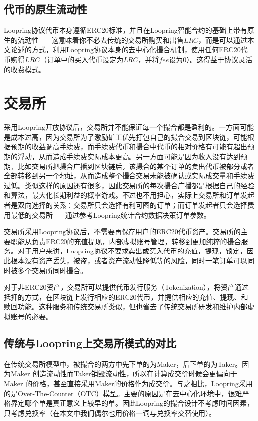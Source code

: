 \documentclass[UTF8,nofonts]{ctexart}
\begin{document}

\subsection{代币的原生流动性}

Loopring协议代币本身遵循ERC20标准，并且在Loopring智能合约的基础上带有原生的流动性\ --- 这意味着你不必去传统的交易所购买和出售$LRC$，而是可以通过本文论述的方式，利用Loopring协议本身的去中心化撮合机制，使用任何ERC20代币购得$LRC$（订单中的买入代币设定为$LRC$，并将$fee$设为0）。这得益于协议灵活的收费模式。


\section{交易所\label{sec:exchange}}

采用Loopring开放协议后，交易所并不能保证每一个撮合都是盈利的。一方面可能是成本过高，因为交易所为了激励矿工优先打包自己的撮合交易到区块链，可能根据预期的收益调高手续费，而手续费代币和撮合中代币的相对价格有可能有超出预期的浮动，从而造成手续费实际成本更高。另一方面可能是因为收入没有达到预期，比如交易所把撮合广播到区块链后，该撮合的某个订单的卖出代币被部分或者全部转移到另一个地址，从而造成整个撮合交易未能被确认或实际成交量和手续费过低。类似这样的原因还有很多，因此交易所的每次撮合广播都是根据自己的经验和算法，最大化长期利益的概率游戏。不过也不用担心，实际上交易所和订单发起者是双向选择的关系：交易所只会选择有利可图的订单；而订单发起者只会选择费用最低的交易所\ --- 通过参考Loopring统计合约数据决策订单参数。

交易所采用Loopring协议后，不需要再保存用户的ERC20代币资产。交易所的主要职能从负责ERC20的充值提现，内部虚拟账号管理，转移到更加纯粹的撮合服务。对于用户来讲，Loopring协议不要求卖出或买入代币的充值，提现，锁定，因此根本没有资产丢失，被盗，或者资产流动性降低等的风险，同时一笔订单可以同时被多个交易所同时撮合。

对于非ERC20资产，交易所可以提供代币发行服务（Tokenization），将资产通过抵押的方式，在区块链上发行相应的ERC20代币，并提供相应的充值、提现、和赎回功能。这种服务和传统交易所类似，但也省去了传统交易所研发和维护内部虚拟账号的必要。

\subsection{传统与Loopring上交易所模式的对比}
在传统交易所模型中，被撮合的两方中先下单的为Maker，后下单的为Taker。因为Maker 创造流动性而Taker销毁流动性，所以在计算成交价时候会更偏向于Maker 的价格，甚至直接采用Maker的价格作为成交价。与之相比，Loopring采用的是Over-The-Counter（OTC）模型。主要的原因是在去中心化环境中，很难严格界定哪个单是真正意义上较早的单。因此Loopring的撮合设计不考虑时间因素，只考虑兑换率（在本文中我们偶尔也用价格一词与兑换率交替使用）。
\end{document}
